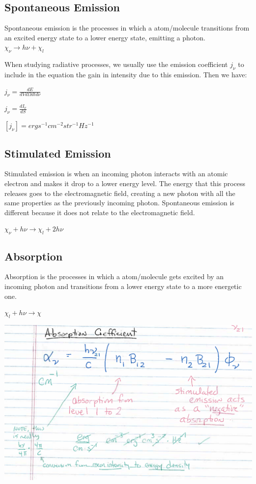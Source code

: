 \subsection{Spontaneous Emission}

Spontaneous emission is the processes in which a atom/molecule transitions from an excited energy state to a lower energy state, emitting a photon. 
\\$\chi_\nu \longrightarrow h\nu + \chi_l$

When studying radiative processes, we usually use the emission coefficient $j_\nu$ to include in the equation the gain in intensity due to this emission. Then we have:

$j_\nu = \frac{dE}{dV d\Omega dt d\nu}$

$j_\nu = \frac{dI_\nu}{dS}$

$[j_\nu] = erg s^{-1} cm^{-2} str^{-1} Hz^{-1}$

\subsection{Stimulated Emission}

Stimulated emission is when an incoming photon interacts with an atomic electron and makes it drop to a lower energy level. The energy that this process releases goes to the electromagnetic field, creating a new photon with all the same properties as the previously incoming photon. Spontaneous emission is different because it does not relate to the electromagnetic field.

$\chi_\nu + h\nu \longrightarrow \chi_l + 2h\nu$

\subsection{Absorption}

Absorption is the processes in which a atom/molecule gets excited by an incoming photon and transitions from a lower energy state to a more energetic one.

$\chi_l + h\nu \longrightarrow \chi$

\includegraphics[scale=.5]{absorption.png}

